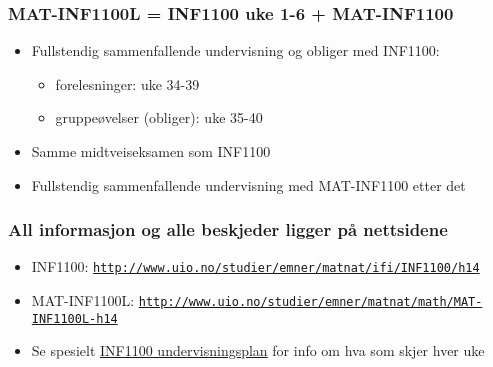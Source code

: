 \documentclass{beamer}
\begin{document}
\begin{frame}
\frametitle{MAT-INF1100L = INF1100 uke 1-6 + MAT-INF1100}

\begin{block}{}
\begin{itemize}
 \item Fullstendig sammenfallende undervisning og obliger med INF1100:
\begin{itemize}

   \item forelesninger: uke 34-39

   \item gruppeøvelser (obliger): uke 35-40

\end{itemize}

\noindent
 \item Samme midtveiseksamen som INF1100

 \item Fullstendig sammenfallende undervisning med MAT-INF1100 etter det
\end{itemize}

\noindent
\end{block}
\end{frame}

\begin{frame}
\frametitle{All informasjon og alle beskjeder ligger på nettsidene}

\begin{itemize}
 \item INF1100:
   \href{{http://www.uio.no/studier/emner/matnat/ifi/INF1100/h14}}{\nolinkurl{http://www.uio.no/studier/emner/matnat/ifi/INF1100/h14}}

 \item MAT-INF1100L:
   \href{{http://www.uio.no/studier/emner/matnat/math/MAT-INF1100L-h14}}{\nolinkurl{http://www.uio.no/studier/emner/matnat/math/MAT-INF1100L-h14}}

 \item Se spesielt \href{{https://www.uio.no/studier/emner/matnat/ifi/INF1100/h14/ressurser/undervisningsplan.html}}{INF1100 undervisningsplan} for info om hva som skjer hver uke
\end{itemize}

\noindent
\end{frame}
\end{document}
